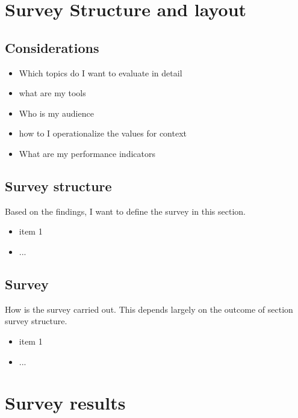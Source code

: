     \chapter{Survey Structure and layout}

        \section{Considerations}

            \begin{itemize}
                \item Which topics do I want to evaluate in detail
                \item what are my tools
                \item Who is my audience
                \item how to I operationalize the values for context
                \item What are my performance indicators
            \end{itemize}

        \section{Survey structure}

            Based on the findings, I want to define the survey in this section.

            \begin{itemize}
                \item item 1
                \item ...
            \end{itemize}

        \section{Survey}

            How is the survey carried out. This depends largely on the outcome of section survey structure.

            \begin{itemize}
                \item item 1
                \item ...
            \end{itemize}

    \chapter{Survey results}

